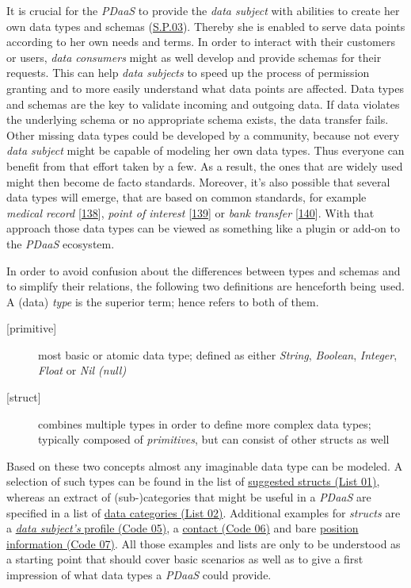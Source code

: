 \documentclass[12pt,english,a4paper,titlepage,cleardoublepage=empty,dottedtoc]{report}
\begin{document}
It is crucial for the \emph{PDaaS} to provide the \emph{data subject}
with abilities to create her own data types and schemas
(\protect\hyperlink{sp03}{S.P.03}). Thereby she is enabled to serve data
points according to her own needs and terms. In order to interact with
their customers or users, \emph{data consumers} might as well develop
and provide schemas for their requests. This can help \emph{data
subjects} to speed up the process of permission granting and to more
easily understand what data points are affected. Data types and schemas
are the key to validate incoming and outgoing data. If data violates the
underlying schema or no appropriate schema exists, the data transfer
fails. Other missing data types could be developed by a community,
because not every \emph{data subject} might be capable of modeling her
own data types. Thus everyone can benefit from that effort taken by a
few. As a result, the ones that are widely used might then become de
facto standards. Moreover, it's also possible that several data types
will emerge, that are based on common standards, for example
\emph{medical record}
{[}\protect\hyperlink{ref-web_spec_data-schemas_ehr}{138}{]},
\emph{point of interest}
{[}\protect\hyperlink{ref-web_spec_data-schemas_poi}{139}{]} or
\emph{bank transfer}
{[}\protect\hyperlink{ref-web_spec_data-schemas_bank-transfer}{140}{]}.
With that approach those data types can be viewed as something like a
plugin or add-on to the \emph{PDaaS} ecosystem.

In order to avoid confusion about the differences between types and
schemas and to simplify their relations, the following two definitions
are henceforth being used. A (data) \emph{type} is the superior term;
hence refers to both of them.

\begin{description}
\item[{[}primitive{]}]
most basic or atomic data type; defined as either \emph{String},
\emph{Boolean}, \emph{Integer}, \emph{Float} or \emph{Nil (null)}
\item[{[}struct{]}]
combines multiple types in order to define more complex data types;
typically composed of \emph{primitives}, but can consist of other
structs as well
\end{description}

Based on these two concepts almost any imaginable data type can be
modeled. A selection of such types can be found in the list of
\protect\hyperlink{list-01_suggested-structs}{suggested structs (List
01)}, whereas an extract of (sub-)categories that might be useful in a
\emph{PDaaS} are specified in a list of
\protect\hyperlink{list-02_data-categories}{data categories (List 02)}.
Additional examples for \emph{structs} are a
\protect\hyperlink{code-05_struct_profile}{\emph{data subject's} profile
(Code 05)}, a \protect\hyperlink{code-06_struct_contact}{contact (Code
06)} and bare \protect\hyperlink{code-07_struct_position}{position
information (Code 07)}. All those examples and lists are only to be
understood as a starting point that should cover basic scenarios as well
as to give a first impression of what data types a \emph{PDaaS} could
provide.
\end{document}
